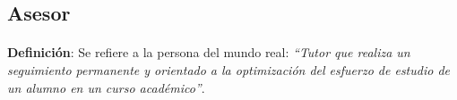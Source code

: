\subsection{Asesor}

  \paragraph{}\textbf{Definición}: Se refiere a la persona del mundo real:
  \emph{``Tutor que realiza un seguimiento permanente y orientado a la
  optimización del esfuerzo de estudio de un alumno en un curso académico''}.




